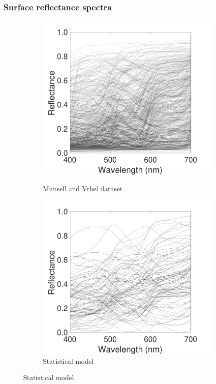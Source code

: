 \documentclass{jov}
\begin{document}
\subsubsection{Surface reflectance spectra}
\begin{figure}
\centering
	\begin{subfigure}{0.24 \textwidth}
    \centering
            \caption{Munsell and Vrhel dataset}
        \includegraphics[width=\textwidth]{../FiguresDraft4/Figure7/Figure7_a.pdf}
        \label{fig:reflectanceSpectra}
    \end{subfigure}
    \begin{subfigure}{0.24 \textwidth}
    \centering
        \caption{Statistical model}
        \includegraphics[width=\textwidth]{../FiguresDraft4/Figure7/Figure7_b.pdf}

\end{subfigure}
\end{figure}
\end{document}

